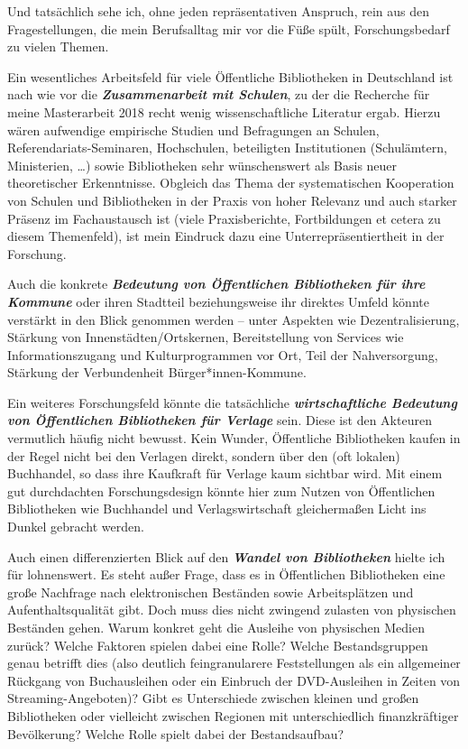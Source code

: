 \documentclass[a4paper,
fontsize=11pt,
oneside,
numbers=noperiodatend,
parskip=half-,
bibliography=totoc,
final
]{scrartcl}
\begin{document}
Und tatsächlich sehe ich, ohne jeden repräsentativen Anspruch, rein aus
den Fragestellungen, die mein Berufsalltag mir vor die Füße spült,
Forschungsbedarf zu vielen Themen.

Ein wesentliches Arbeitsfeld für viele Öffentliche Bibliotheken in
Deutschland ist nach wie vor die \textbf{\emph{Zusammenarbeit mit
Schulen}}, zu der die Recherche für meine Masterarbeit 2018 recht wenig
wissenschaftliche Literatur ergab. Hierzu wären aufwendige empirische
Studien und Befragungen an Schulen, Referendariats-Seminaren,
Hochschulen, beteiligten Institutionen (Schulämtern, Ministerien,
\ldots) sowie Bibliotheken sehr wünschenswert als Basis neuer
theoretischer Erkenntnisse. Obgleich das Thema der systematischen
Kooperation von Schulen und Bibliotheken in der Praxis von hoher
Relevanz und auch starker Präsenz im Fachaustausch ist (viele
Praxisberichte, Fortbildungen et cetera zu diesem Themenfeld), ist mein
Eindruck dazu eine Unterrepräsentiertheit in der Forschung.

Auch die konkrete \textbf{\emph{Bedeutung von Öffentlichen Bibliotheken
für ihre Kommune}} oder ihren Stadtteil beziehungsweise ihr direktes
Umfeld könnte verstärkt in den Blick genommen werden -- unter Aspekten
wie Dezentralisierung, Stärkung von Innenstädten/Ortskernen,
Bereitstellung von Services wie Informationszugang und Kulturprogrammen
vor Ort, Teil der Nahversorgung, Stärkung der Verbundenheit
Bürger*innen-Kommune.

Ein weiteres Forschungsfeld könnte die tatsächliche
\textbf{\emph{wirtschaftliche Bedeutung von Öffentlichen Bibliotheken
für Verlage}} sein. Diese ist den Akteuren vermutlich häufig nicht
bewusst. Kein Wunder, Öffentliche Bibliotheken kaufen in der Regel nicht
bei den Verlagen direkt, sondern über den (oft lokalen) Buchhandel, so
dass ihre Kaufkraft für Verlage kaum sichtbar wird. Mit einem gut
durchdachten Forschungsdesign könnte hier zum Nutzen von Öffentlichen
Bibliotheken wie Buchhandel und Verlagswirtschaft gleichermaßen Licht
ins Dunkel gebracht werden.

Auch einen differenzierten Blick auf den \textbf{\emph{Wandel von
Bibliotheken}} hielte ich für lohnenswert. Es steht außer Frage, dass es
in Öffentlichen Bibliotheken eine große Nachfrage nach elektronischen
Beständen sowie Arbeitsplätzen und Aufenthaltsqualität gibt. Doch muss
dies nicht zwingend zulasten von physischen Beständen gehen. Warum
konkret geht die Ausleihe von physischen Medien zurück? Welche Faktoren
spielen dabei eine Rolle? Welche Bestandsgruppen genau betrifft dies
(also deutlich feingranularere Feststellungen als ein allgemeiner
Rückgang von Buchausleihen oder ein Einbruch der
DVD-Ausleihen in Zeiten von Streaming-Angeboten)? Gibt es Unterschiede
zwischen kleinen und großen Bibliotheken oder vielleicht zwischen
Regionen mit unterschiedlich finanzkräftiger Bevölkerung? Welche Rolle
spielt dabei der Bestandsaufbau?
\end{document}
